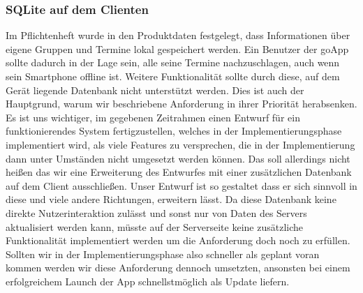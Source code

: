 	\subsubsection{SQLite auf dem Clienten}
	Im Pflichtenheft wurde in den Produktdaten festgelegt, dass Informationen über eigene Gruppen und Termine lokal gespeichert werden. Ein Benutzer der goApp sollte dadurch in der Lage sein, alle seine Termine nachzuschlagen, auch wenn sein Smartphone offline ist. Weitere Funktionalität sollte durch diese, auf dem Gerät liegende Datenbank nicht unterstützt werden.
	\newline Dies ist auch der Hauptgrund, warum wir beschriebene Anforderung in ihrer Priorität herabsenken. Es ist uns wichtiger, im gegebenen Zeitrahmen einen Entwurf für ein funktionierendes System fertigzustellen, welches in der Implementierungsphase implementiert wird, als viele Features zu versprechen, die in der Implementierung dann unter Umständen nicht umgesetzt werden können.
	\newline Das soll allerdings nicht heißen das wir eine Erweiterung des Entwurfes mit einer zusätzlichen Datenbank auf dem Client ausschließen. Unser Entwurf ist so gestaltet dass er sich sinnvoll in diese und viele andere Richtungen, erweitern lässt.
	Da diese Datenbank keine direkte Nutzerinteraktion zulässt und sonst nur von Daten des Servers aktualisiert werden kann, müsste auf der Serverseite keine zusätzliche Funktionalität implementiert werden um die Anforderung doch noch zu erfüllen.
	\newline Sollten wir in der Implementierungsphase also schneller als geplant voran kommen werden wir diese Anforderung dennoch umsetzten, ansonsten bei einem erfolgreichem Launch der App schnellstmöglich als Update liefern.  
	\newpage